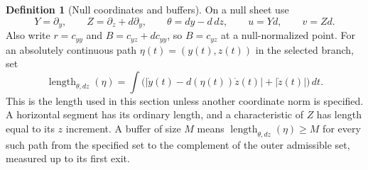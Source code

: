 \documentclass[11pt]{amsart}
\theoremstyle{definition}
\newtheorem{definition}{Definition}[section]
\theoremstyle{remark}
\numberwithin{equation}{section}
\begin{document}
\begin{definition}[Null coordinates and buffers]\label{def:null-coordinates}
On a null sheet use
\[
Y=\partial_y,\qquad Z=\partial_z+d\partial_y,\qquad \theta=dy-d\,dz,\qquad u=Yd,\qquad v=Zd.
\]
Also write $r=c_{yy}$ and $B=c_{yz}+dc_{yy}$, so $B=c_{yz}$ at a null-normalized point. For an absolutely continuous path $\eta(t)=(y(t),z(t))$ in the selected branch, set
\[
\operatorname{length}_{\theta,dz}(\eta)=\int\bigl(|\dot y(t)-d(\eta(t))\dot z(t)|+|\dot z(t)|\bigr)\,dt.
\]
This is the length used in this section unless another coordinate norm is specified. A horizontal segment has its ordinary length, and a characteristic of $Z$ has length equal to its $z$ increment. A buffer of size $M$ means $\operatorname{length}_{\theta,dz}(\eta)\ge M$ for every such path from the specified set to the complement of the outer admissible set, measured up to its first exit.
\end{definition}
\end{document}
